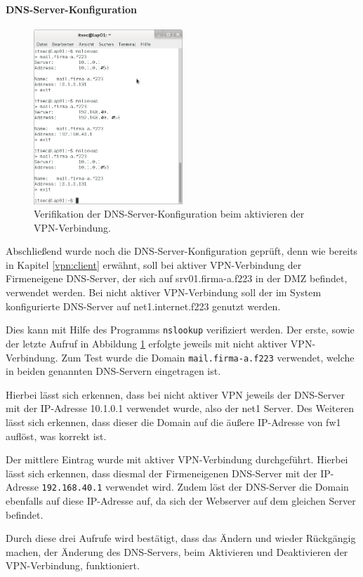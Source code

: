 \paragraph{DNS-Server-Konfiguration}

\begin{figure}[h!]
  \centering
    \includegraphics[width=0.5\textwidth]{figures/vpn_nslookup.png}
  \caption{Verifikation der DNS-Server-Konfiguration beim aktivieren der VPN-Verbindung.}
  \label{vpn:lap01_nslookup}
\end{figure}

Abschließend wurde noch die DNS-Server-Konfiguration geprüft, denn wie bereits in Kapitel \ref{vpn:client} erwähnt, soll bei aktiver VPN-Verbindung der Firmeneigene DNS-Server, der sich auf srv01.firma-a.f223 in der DMZ befindet, verwendet werden. Bei nicht aktiver VPN-Verbindung soll der im System konfigurierte DNS-Server auf net1.internet.f223 genutzt werden.

Dies kann mit Hilfe des Programms \texttt{nslookup} verifiziert werden. Der erste, sowie der letzte Aufruf in Abbildung \ref{vpn:lap01_nslookup} erfolgte jeweils mit nicht aktiver VPN-Verbindung. Zum Test wurde die Domain \texttt{mail.firma-a.f223} verwendet, welche in beiden genannten DNS-Servern eingetragen ist.

Hierbei lässt sich erkennen, dass bei nicht aktiver VPN jeweils der DNS-Server mit der IP-Adresse 10.1.0.1 verwendet wurde, also der net1 Server. Des Weiteren lässt sich erkennen, dass dieser die Domain auf die äußere IP-Adresse von fw1 auflöst, was korrekt ist.

Der mittlere Eintrag wurde mit aktiver VPN-Verbindung durchgeführt. Hierbei lässt sich erkennen, dass diesmal der Firmeneigenen DNS-Server mit der IP-Adresse \texttt{192.168.40.1} verwendet wird. Zudem löst der DNS-Server die Domain ebenfalls auf diese IP-Adresse auf, da sich der Webserver auf dem gleichen Server befindet.

Durch diese drei Aufrufe wird bestätigt, dass das Ändern und wieder Rückgängig machen, der Änderung des DNS-Servers, beim Aktivieren und Deaktivieren der VPN-Verbindung, funktioniert.
